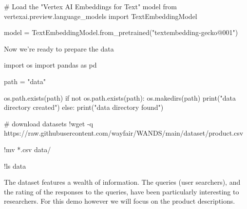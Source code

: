 \documentclass[
  letterpaper,
  DIV=11,
  numbers=noendperiod]{scrreprt}
\newenvironment{Shaded}{\begin{snugshade}}{\end{snugshade}}
\newcommand{\BuiltInTok}[1]{\textcolor[rgb]{0.00,0.23,0.31}{#1}}
\newcommand{\CommentTok}[1]{\textcolor[rgb]{0.37,0.37,0.37}{#1}}
\newcommand{\ControlFlowTok}[1]{\textcolor[rgb]{0.00,0.23,0.31}{#1}}
\newcommand{\ImportTok}[1]{\textcolor[rgb]{0.00,0.46,0.62}{#1}}
\newcommand{\KeywordTok}[1]{\textcolor[rgb]{0.00,0.23,0.31}{#1}}
\newcommand{\NormalTok}[1]{\textcolor[rgb]{0.00,0.23,0.31}{#1}}
\newcommand{\OperatorTok}[1]{\textcolor[rgb]{0.37,0.37,0.37}{#1}}
\newcommand{\StringTok}[1]{\textcolor[rgb]{0.13,0.47,0.30}{#1}}
\begin{document}
\begin{Shaded}
\begin{Highlighting}[]
\CommentTok{\# Load the "Vertex AI Embeddings for Text" model}
\ImportTok{from}\NormalTok{ vertexai.preview.language\_models }\ImportTok{import}\NormalTok{ TextEmbeddingModel}

\NormalTok{model }\OperatorTok{=}\NormalTok{ TextEmbeddingModel.from\_pretrained(}\StringTok{"textembedding{-}gecko@001"}\NormalTok{)}
\end{Highlighting}
\end{Shaded}

Now we're ready to prepare the data

\begin{Shaded}
\begin{Highlighting}[]
\ImportTok{import}\NormalTok{ os}
\ImportTok{import}\NormalTok{ pandas }\ImportTok{as}\NormalTok{ pd}

\NormalTok{path }\OperatorTok{=} \StringTok{"data"}

\NormalTok{os.path.exists(path)}
\ControlFlowTok{if} \KeywordTok{not}\NormalTok{ os.path.exists(path):}
\NormalTok{  os.makedirs(path)}
  \BuiltInTok{print}\NormalTok{(}\StringTok{"data directory created"}\NormalTok{)}
\ControlFlowTok{else}\NormalTok{:}
  \BuiltInTok{print}\NormalTok{(}\StringTok{"data directory found"}\NormalTok{)}
\end{Highlighting}
\end{Shaded}

\begin{Shaded}
\begin{Highlighting}[]
\CommentTok{\# download datasets}
\OperatorTok{!}\NormalTok{wget }\OperatorTok{{-}}\NormalTok{q https:}\OperatorTok{//}\NormalTok{raw.githubusercontent.com}\OperatorTok{/}\NormalTok{wayfair}\OperatorTok{/}\NormalTok{WANDS}\OperatorTok{/}\NormalTok{main}\OperatorTok{/}\NormalTok{dataset}\OperatorTok{/}\NormalTok{product.csv}

\OperatorTok{!}\NormalTok{mv }\OperatorTok{*}\NormalTok{.csv data}\OperatorTok{/}
\end{Highlighting}
\end{Shaded}

\begin{Shaded}
\begin{Highlighting}[]
\OperatorTok{!}\NormalTok{ls data}
\end{Highlighting}
\end{Shaded}

The dataset features a wealth of information. The queries (user
searchers), and the rating of the responses to the queries, have been
particularly interesting to researchers. For this demo however we will
focus on the product descriptions.
\end{document}
